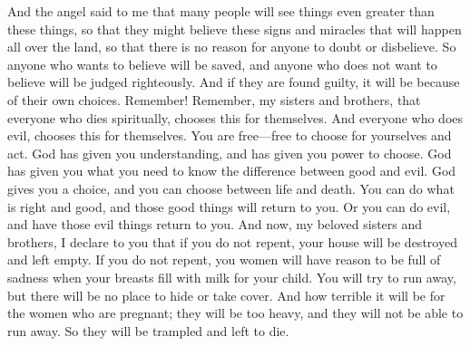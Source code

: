 And the angel said to me that many people will see things even greater than these things, so that they might believe these signs and miracles that will happen all over the land, so that there is no reason for anyone to doubt or disbelieve.
\bverse \iffalse And this to the intent that whosoever will believe might be saved, and that whosoever will not believe, a righteous judgment might come upon them; and also if they are condemned they bring upon themselves their own condemnation. \fi
So anyone who wants to believe will be saved, and anyone who does not want to believe will be judged righteously. And if they are found guilty, it will be because of their own choices.
\bverse \iffalse And now remember, remember, my brethren, that whosoever perisheth, perisheth unto himself; and whosoever doeth iniquity, doeth it unto himself; for behold, ye are free; ye are permitted to act for yourselves; for behold, God hath given unto you a knowledge and he hath made you free. \fi
Remember! Remember, my sisters and brothers, that everyone who dies spiritually, chooses this for themselves. And everyone who does evil, chooses this for themselves. You are free---free to choose for yourselves and act. God has given you understanding, and has given you power to choose.
\bverse \iffalse He hath given unto you that ye might know good from evil, and he hath given unto you that ye might choose life or death; and ye can do good and be restored unto that which is good, or have that which is good restored unto you; or ye can do evil, and have that which is evil restored unto you. \fi
God has given you what you need to know the difference between good and evil. God gives you a choice, and you can choose between life and death. You can do what is right and good, and those good things will return to you. Or you can do evil, and have those evil things return to you.
\bchapter
\bverse \iffalse And now, my beloved brethren, behold, I declare unto you that except ye shall repent your houses shall be left unto you desolate. \fi
And now, my beloved sisters and brothers, I declare to you that if you do not repent, your house will be destroyed and left empty.
\bverse \iffalse Yea, except ye repent, your women shall have great cause to mourn in the day that they shall give suck; for ye shall attempt to flee and there shall be no place for refuge; yea, and wo unto them which are with child, for they shall be heavy and cannot flee; therefore, they shall be trodden down and shall be left to perish. \fi
If you do not repent, you women will have reason to be full of sadness when your breasts fill with milk for your child. You will try to run away, but there will be no place to hide or take cover. And how terrible it will be for the women who are pregnant; they will be too heavy, and they will not be able to run away. So they will be trampled and left to die.
